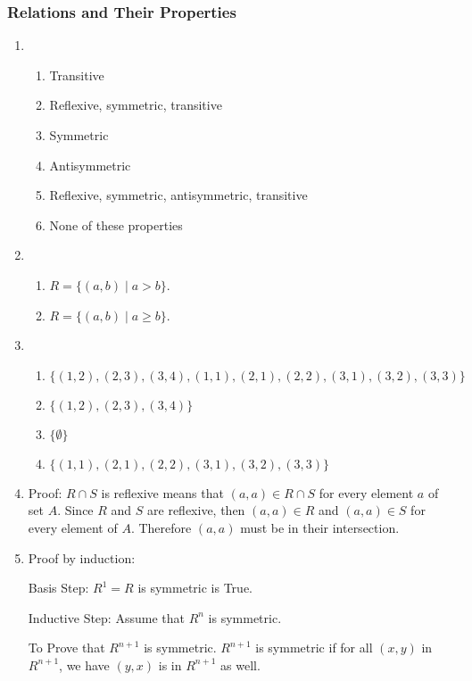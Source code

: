 \documentclass{sig-alternate-05-2015}
\begin{document}
\subsubsection{Relations and Their Properties}
\begin{enumerate}
\item
\begin{enumerate}
	\item Transitive
	\item Reflexive, symmetric, transitive
	\item Symmetric
	\item Antisymmetric
	\item Reflexive, symmetric, antisymmetric, transitive
	\item None of these properties
\end{enumerate}

\item 
\begin{enumerate}
	\item $R = \{(a, b) \mid a > b\}$.
	\item $R = \{(a, b) \mid a \ge b\}$.
\end{enumerate}

\item
\begin{enumerate}
	\item  $\{(1,2), (2,3), (3,4), (1,1), (2,1), (2,2), (3,1), (3,2), (3,3)\}$
	\item $\{(1,2), (2,3), (3,4)\}$
	\item $\{\emptyset\}$
	\item $\{(1,1), (2,1), (2,2), (3,1), (3,2), (3,3)\}$
\end{enumerate}

\item Proof: $R \cap S$ is reflexive means that $(a,a) \in R\cap S $ for every element $a$ of set $A$.
Since $R$ and $S$ are reflexive, then $(a,a)\in R $ and $(a,a)\in S$ for every element of $A$.
Therefore $(a,a)$ must be in their intersection.

\item Proof by induction:

Basis Step: $R^1= R$ is symmetric is True.

Inductive Step: Assume that $R^n$ is symmetric.

To Prove that $R^{n+1}$ is symmetric.
$R^{n+1}$ is symmetric if for all $(x,y)$ in $R^{n+1}$, we have $(y,x)$ is in $R^{n+1}$ as well.

\end{enumerate}
\end{document}
